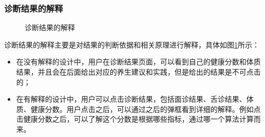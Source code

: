 \subsubsection{诊断结果的解释}
\begin{figure}[htbp]
    \centering
    \caption{诊断结果的解释}
    \label{fig:exp_result}
\end{figure}

诊断结果的解释主要是对结果的判断依据和相关原理进行解释，具体如图\ref{fig:exp_result}所示：
\begin{itemize}
    \item 在没有解释的设计中，用户在诊断结果页面，可以看到自己的健康分数和体质结果，并且会在后面给出对应的养生建议和实践，但是给出的结果是不可点击的；
    \item 在有解释的设计中，用户可以点击诊断结果，包括面诊结果、舌诊结果、体质、健康分数。用户点击之后，可以通过之后的弹框看到详细的解释。例如点击健康分数之后，可以了解这个分数是根据哪些指标，通过哪一个算法计算而来。
\end{itemize}

